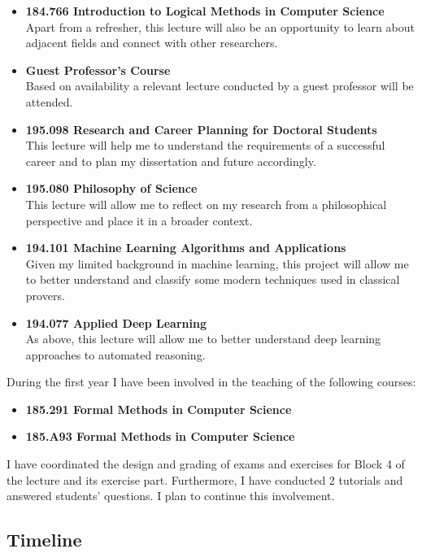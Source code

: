 \documentclass{article}
\theoremstyle{definition}
\theoremstyle{definition}
\theoremstyle{definition}
\theoremstyle{definition}
\theoremstyle{definition}
\theoremstyle{definition}
\theoremstyle{definition}
\newcommand{\0}{\mathbf 0}
\newcommand{\1}{\mathbf 1}
\newcounter{question}
\begin{document}
	\begin{itemize}
		\item\textbf{184.766 Introduction to Logical Methods in Computer Science}\\Apart from a refresher, this lecture will also be an opportunity to learn about adjacent fields and connect with other researchers.
		\item \textbf{Guest Professor’s Course}\\Based on availability a relevant lecture conducted by a guest professor will be attended.
		\item \textbf{195.098 Research and Career Planning for Doctoral Students}\\This lecture will help me to understand the requirements of a successful career and to plan my dissertation and future accordingly.
		\item \textbf{195.080 Philosophy of Science}\\This lecture will allow me to reflect on my research from a philosophical perspective and place it in a broader context.
		\item \textbf{194.101 Machine Learning Algorithms and Applications}\\Given my limited background in machine learning, this project will allow me to better understand and classify some modern techniques used in classical provers.
		\item \textbf{194.077 Applied Deep Learning}\\As above, this lecture will allow me to better understand deep learning approaches to automated reasoning.
	\end{itemize}
	During the first year I have been involved in the teaching of the following courses:
	\begin{itemize}
		\item \textbf{185.291 Formal Methods in Computer Science}
		\item \textbf{185.A93 Formal Methods in Computer Science}
	\end{itemize}
	I have coordinated the design and grading of exams and exercises for Block 4 of the lecture and its exercise part. Furthermore, I have conducted 2 tutorials and answered students' questions. I plan to continue this involvement.

	\subsection{Timeline}
\end{document}
